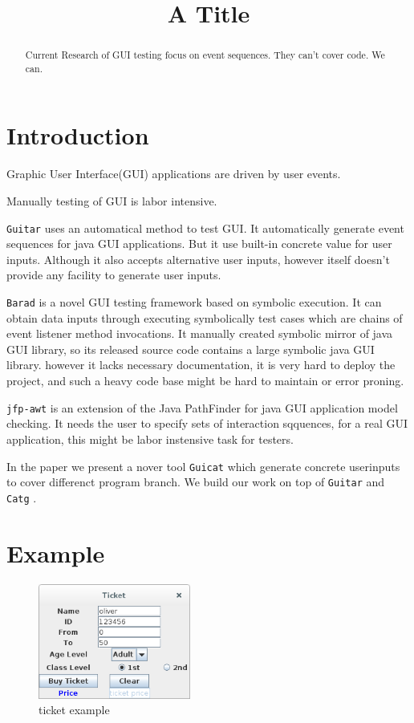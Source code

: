 \documentclass{article}
\begin{document}
\title{A Title}


\maketitle

\begin{abstract}
  Current Research of GUI testing focus on event sequences.
  They can't cover code.
  We can.
\end{abstract}

\section{Introduction}\label{section:introduction}

Graphic User Interface(GUI) applications are driven by user events.

Manually testing of GUI is labor intensive.

\texttt{Guitar} \cite{guitar} uses an automatical method to test GUI. It automatically generate event sequences for java GUI applications. But it use built-in concrete value for user inputs. Although it also accepts alternative user inputs, however itself doesn't provide any facility to generate user inputs.

\texttt{Barad} \cite{barad} is a novel GUI testing framework based on symbolic execution. It can obtain data inputs through executing symbolically test cases which are chains of event listener method invocations. It manually created symbolic mirror of java GUI library, so its released source code contains a large symbolic java GUI library. however it lacks necessary documentation, it is very hard to deploy the project, and such a heavy code base might be hard to maintain or error proning.

\texttt{jfp-awt} \cite{jpfawt} is an extension of the Java PathFinder for java GUI application model checking. It needs the user to specify sets of interaction sqquences, for a real GUI application, this might be labor instensive task for testers.

In the paper we present a nover tool \texttt{Guicat} which generate concrete userinputs to cover differenct program branch. We build our work on top of \texttt{Guitar} and \texttt{Catg} \cite{catg}.


\section{Example}

\begin{figure}
  \centering
  \includegraphics[width=50mm,scale=0.5]{./res/ticket.png}
  \caption{ticket example}
\end{figure}
\end{document}
